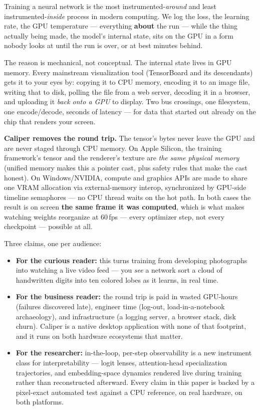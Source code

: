 \documentclass[11pt]{article}
\begin{document}
Training a neural network is the most instrumented-\emph{around} and least
instrumented-\emph{inside} process in modern computing. We log the loss, the
learning rate, the GPU temperature --- everything \textbf{about} the run ---
while the thing actually being made, the model's internal state, sits on the
GPU in a form nobody looks at until the run is over, or at best minutes
behind.

The reason is mechanical, not conceptual. The internal state lives in GPU
memory. Every mainstream visualization tool (TensorBoard and its descendants)
gets it to your eyes by: copying it to CPU memory, encoding it to an image
file, writing that to disk, polling the file from a web server, decoding it
in a browser, and uploading it \emph{back onto a GPU} to display. Two bus
crossings, one filesystem, one encode/decode, seconds of latency --- for data
that started out already on the chip that renders your screen.

\textbf{Caliper removes the round trip.} The tensor's bytes never leave the
GPU and are never staged through CPU memory. On Apple Silicon, the training
framework's tensor and the renderer's texture are \emph{the same physical
memory} (unified memory makes this a pointer cast, plus safety rules that
make the cast honest). On Windows/NVIDIA, compute and graphics APIs are made
to share one VRAM allocation via external-memory interop, synchronized by
GPU-side timeline semaphores --- no CPU thread waits on the hot path. In both
cases the result is on screen \textbf{the same frame it was computed}, which
is what makes watching weights reorganize at 60\,fps --- every optimizer
step, not every checkpoint --- possible at all.

Three claims, one per audience:

\begin{itemize}
  \item \textbf{For the curious reader:} this turns training from developing
        photographs into watching a live video feed --- you \emph{see} a
        network sort a cloud of handwritten digits into ten colored lobes as
        it learns, in real time.
  \item \textbf{For the business reader:} the round trip is paid in wasted
        GPU-hours (failures discovered late), engineer time (log-out,
        load-in-a-notebook archaeology), and infrastructure (a logging
        server, a browser stack, disk churn). Caliper is a native desktop
        application with none of that footprint, and it runs on both hardware
        ecosystems that matter.
  \item \textbf{For the researcher:} in-the-loop, per-step observability is a
        new instrument class for interpretability --- logit lenses,
        attention-head specialization trajectories, and embedding-space
        dynamics rendered live during training rather than reconstructed
        afterward. Every claim in this paper is backed by a pixel-exact
        automated test against a CPU reference, on real hardware, on both
        platforms.
\end{itemize}
\end{document}

